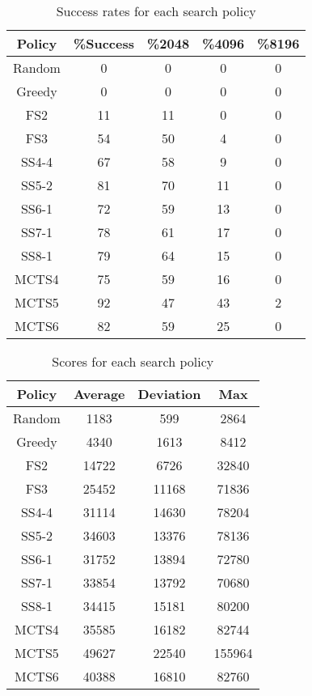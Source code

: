 \documentclass[conference]{IEEEtran}
\begin{document}
\begin{table}[htbp]
	\caption{ Success rates for each search policy }
	\begin{center}
		\begin{tabular}{|c||c|c|c|c|}
			\hline
			Policy & \%Success & \%2048 & \%4096 & \%8196 \\
			\hline\hline
			Random & 0 & 0 & 0 & 0 \\
			\hline
			Greedy & 0 & 0 & 0 & 0 \\
			\hline
			FS2    & 11 & 11 & 0 & 0 \\
			\hline
			FS3    & 54 & 50 & 4 & 0 \\
			\hline
			SS4-4  & 67 & 58 & 9 & 0 \\
			\hline
			SS5-2  & 81 & 70 & 11 & 0 \\
			\hline
			SS6-1  & 72 & 59 & 13 & 0 \\
			\hline
			SS7-1  & 78 & 61 & 17 & 0 \\
			\hline
			SS8-1  & 79 & 64 & 15 & 0 \\
			\hline
			MCTS4  & 75 & 59 & 16 & 0 \\
			\hline
			MCTS5  & 92 & 47 & 43 & 2 \\
			\hline
			MCTS6  & 82 & 59 & 25 & 0 \\
			\hline
		\end{tabular}
		\label{tab1}
	\end{center}
\end{table}

\begin{table}[htbp]
	\caption{ Scores for each search policy }
	\begin{center}
		\begin{tabular}{|c||c|c|c|}
			\hline
			Policy & Average & Deviation & Max \\
			\hline\hline
			Random & 1183 & 599 & 2864 \\
			\hline
			Greedy & 4340 & 1613 & 8412 \\
			\hline
			FS2    & 14722  & 6726 & 32840 \\
			\hline
			FS3    & 25452 & 11168 & 71836 \\
			\hline
			SS4-4  & 31114 & 14630 & 78204 \\
			\hline
			SS5-2  & 34603 & 13376 & 78136 \\
			\hline
			SS6-1  & 31752 & 13894 & 72780 \\
			\hline
			SS7-1  & 33854 & 13792 & 70680  \\
			\hline
			SS8-1  & 34415 & 15181 & 80200 \\
			\hline
			MCTS4  & 35585 & 16182 & 82744 \\
			\hline
			MCTS5  & 49627 & 22540 & 155964 \\
			\hline
			MCTS6  & 40388 & 16810 & 82760 \\
			\hline
		\end{tabular}
		\label{tab1}
	\end{center}
\end{table}
\end{document}
